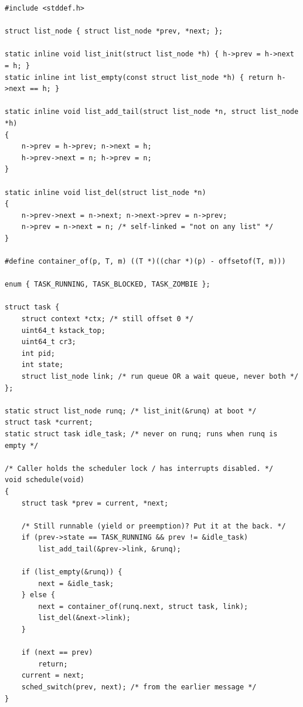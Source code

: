 \begin{lstlisting}[style=cstyle]
#include <stddef.h>

struct list_node { struct list_node *prev, *next; };

static inline void list_init(struct list_node *h) { h->prev = h->next = h; }
static inline int list_empty(const struct list_node *h) { return h->next == h; }

static inline void list_add_tail(struct list_node *n, struct list_node *h)
{
    n->prev = h->prev; n->next = h;
    h->prev->next = n; h->prev = n;
}

static inline void list_del(struct list_node *n)
{
    n->prev->next = n->next; n->next->prev = n->prev;
    n->prev = n->next = n; /* self-linked = "not on any list" */
}

#define container_of(p, T, m) ((T *)((char *)(p) - offsetof(T, m)))

enum { TASK_RUNNING, TASK_BLOCKED, TASK_ZOMBIE };

struct task {
    struct context *ctx; /* still offset 0 */
    uint64_t kstack_top;
    uint64_t cr3;
    int pid;
    int state;
    struct list_node link; /* run queue OR a wait queue, never both */
};

static struct list_node runq; /* list_init(&runq) at boot */
struct task *current;
static struct task idle_task; /* never on runq; runs when runq is empty */

/* Caller holds the scheduler lock / has interrupts disabled. */
void schedule(void)
{
    struct task *prev = current, *next;

    /* Still runnable (yield or preemption)? Put it at the back. */
    if (prev->state == TASK_RUNNING && prev != &idle_task)
        list_add_tail(&prev->link, &runq);

    if (list_empty(&runq)) {
        next = &idle_task;
    } else {
        next = container_of(runq.next, struct task, link);
        list_del(&next->link);
    }

    if (next == prev)
        return;
    current = next;
    sched_switch(prev, next); /* from the earlier message */
}
\end{lstlisting}
% 
